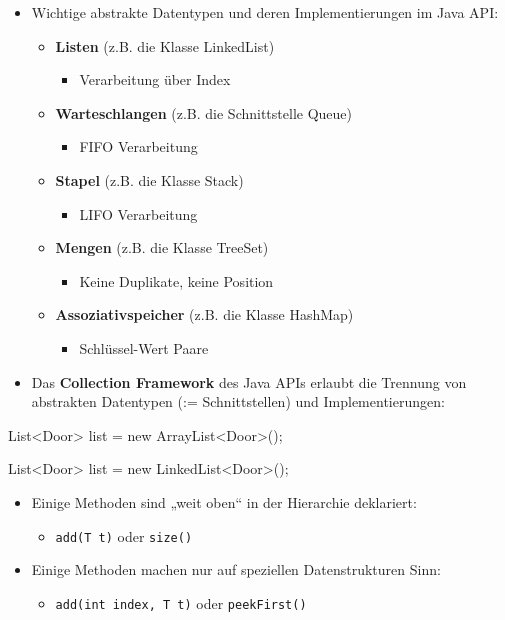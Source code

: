 \documentclass[a4paper,10pt, dvipsnames]{report}
\begin{document}
\begin{itemize}
    \item Wichtige abstrakte Datentypen und deren Implementierungen im Java API:
    \begin{itemize}
        \item \textbf{Listen} (z.B. die Klasse LinkedList)
        \begin{itemize}
            \item Verarbeitung über Index
        \end{itemize}
        \item \textbf{Warteschlangen} (z.B. die Schnittstelle Queue)
        \begin{itemize}
            \item FIFO Verarbeitung
        \end{itemize}
        \item \textbf{Stapel} (z.B. die Klasse Stack)
        \begin{itemize}
            \item LIFO Verarbeitung
        \end{itemize}
        \item \textbf{Mengen} (z.B. die Klasse TreeSet)
        \begin{itemize}
            \item Keine Duplikate, keine Position
        \end{itemize}
        \item \textbf{Assoziativspeicher} (z.B. die Klasse HashMap)
        \begin{itemize}
            \item Schlüssel-Wert Paare
        \end{itemize}
    \end{itemize}
    \item Das \textbf{Collection Framework} des Java APIs erlaubt die Trennung von abstrakten Datentypen (:= Schnittstellen) und Implementierungen:
\end{itemize}

\begin{javacodebox}
List<Door> list = new ArrayList<Door>();

List<Door> list = new LinkedList<Door>();
\end{javacodebox}

\begin{itemize}
    \item Einige Methoden sind „weit oben“ in der Hierarchie deklariert:
    \begin{itemize}
        \item \texttt{add(T t)} oder \texttt{size()}
    \end{itemize}
    \item Einige Methoden machen nur auf speziellen Datenstrukturen Sinn:
    \begin{itemize}
        \item \texttt{add(int index, T t)} oder \texttt{peekFirst()}
    \end{itemize}
\end{itemize}
\end{document}

